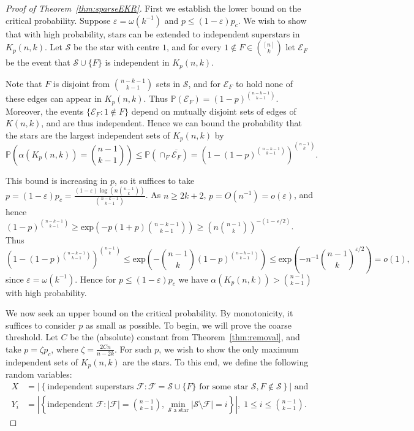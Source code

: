 \documentclass[11pt]{article}
\theoremstyle{definition}
\newcommand{\eps}{\varepsilon}
\newcommand{\cS}{\mathcal{S}}
\newcommand{\cF}{\mathcal{F}}
\newcommand{\cE}{\mathcal{E}}
\newcommand{\3}{\bf{3}}
\newcommand{\card}[1]{\left| #1 \right|}
\newcommand{\Prb}{\mathbb{P}}
\begin{document}
\begin{proof}[Proof of Theorem~\ref{thm:sparseEKR}]
First we establish the lower bound on the critical probability.  Suppose ${\eps = \omega(k^{-1})}$ and $p \le (1 - \eps) p_c$.  We wish to show that with high probability, stars can be extended to independent superstars in $K_p(n,k)$.  Let $\cS$ be the star with centre $1$, and for every $1 \notin F \in \binom{[n]}{k}$ let $\cE_F$ be the event that $\cS \cup \{ F \}$ is independent in $K_p(n,k)$.

Note that $F$ is disjoint from $\binom{n-k-1}{k-1}$ sets in $\cS$, and for $\cE_F$ to hold none of these edges can appear in $K_p(n,k)$.  Thus $\Prb(\cE_F) = (1-p)^{\binom{n-k-1}{k-1}}$.  Moreover, the events $\{ \cE_F : 1 \notin F \}$ depend on mutually disjoint sets of edges of $K(n,k)$, and are thus independent.  Hence we can bound the probability that the stars are the largest independent sets of $K_p(n,k)$ by
\[ \Prb\left( \alpha(K_p(n,k)) = \binom{n-1}{k-1} \right) \le \Prb\left( \cap_F \overline{\cE_F} \right) =  \left(1 - (1-p)^{\binom{n-k-1}{k-1}} \right)^{\binom{n-1}{k}}. \]

This bound is increasing in $p$, so it suffices to take $p = (1 - \eps) p_c = \frac{(1 - \eps) \log \left( n \binom{n-1}{k} \right)}{\binom{n-k-1}{k-1}}$.  As $n \ge 2k + 2$, $p = O(n^{-1}) = o(\eps)$, and hence $(1-p)^{\binom{n-k-1}{k-1}} \ge \mathrm{exp} \left( - p(1 + p) \binom{n-k-1}{k-1} \right) \ge \left(n \binom{n-1}{k} \right)^{-(1 - \eps/2)}$.  Thus
\[ \left(1 - (1-p)^{\binom{n-k-1}{k-1}} \right)^{\binom{n-1}{k}} \le \mathrm{exp} \left( - \binom{n-1}{k} (1-p)^{\binom{n-k-1}{k-1}} \right) \le \mathrm{exp} \left( - n^{-1} \binom{n-1}{k} ^{\eps/2} \right) = o(1), \]
since $\eps = \omega \left(k^{-1} \right)$.  Hence for $p \le (1 - \eps) p_c$ we have $\alpha(K_p(n,k)) > \binom{n-1}{k-1}$ with high probability.

We now seek an upper bound on the critical probability.  By monotonicity, it suffices to consider $p$ as small as possible.  To begin, we will prove the coarse threshold.  Let $C$ be the (absolute) constant from Theorem~\ref{thm:removal}, and take $p = \zeta p_c$, where $\zeta = \frac{2Cn}{n-2k}$.  For such $p$, we wish to show the only maximum independent sets of $K_p(n,k)$ are the stars.  To this end, we define the following random variables:
\begin{align*}
	X &= \card{ \left\{ \textrm{independent superstars } \cF: \cF = \cS \cup \{F \} \textrm{ for some star } \cS, F \notin \cS \right\} } \textrm{ and} \\
	Y_i &= \card{ \left\{ \textrm{independent }\cF: \card{\cF} = \binom{n-1}{k-1}, \min_{\cS \textrm{ a star}} \card{ \cS \setminus \cF } = i \right\} }, \; 1 \le i \le \binom{n-1}{k-1}.
\end{align*}


\end{proof}
\end{document}
